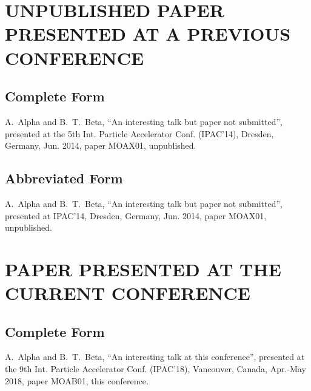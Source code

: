 \section{UNPUBLISHED PAPER PRESENTED AT A PREVIOUS CONFERENCE}

\subsection{Complete Form}

\begin{thebibliography}{9} %
\setcounter{enumi}{3}
	A.~Alpha and B.~T.~Beta,
	“An interesting talk but paper not submitted”,
	presented at the 5th Int. Particle Accelerator Conf. (IPAC’14),
	Dresden, Germany, Jun. 2014, paper MOAX01, unpublished.
\end{thebibliography}

\subsection{Abbreviated Form}

\begin{thebibliography}{9} %
\setcounter{enumi}{3}
	A.~Alpha and B.~T.~Beta,
	“An interesting talk but paper not submitted”,
	presented at IPAC’14,
	Dresden, Germany, Jun. 2014, paper MOAX01, unpublished.
\end{thebibliography}


\section{PAPER PRESENTED AT THE CURRENT CONFERENCE}

\subsection{Complete Form}

\begin{thebibliography}{9} %
\setcounter{enumi}{4}
	A.~Alpha and B.~T.~Beta,
	“An interesting talk at this conference”,
	presented at the 9th Int. Particle Accelerator
	Conf. (IPAC’18), Vancouver, Canada, Apr.-May 2018, 
	paper MOAB01, this conference.
\end{thebibliography}


